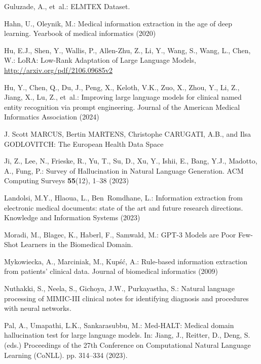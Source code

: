 \begin{thebibliography}{10}
Guluzade, A., et~al.: {ELMTEX Dataset}. 

Hahn, U., Oleynik, M.: Medical information extraction in the age of deep learning. Yearbook of medical informatics  (2020)

Hu, E.J., Shen, Y., Wallis, P., Allen-Zhu, Z., Li, Y., Wang, S., Wang, L., Chen, W.: {LoRA: Low-Rank Adaptation of Large Language Models}, \url{http://arxiv.org/pdf/2106.09685v2}

Hu, Y., Chen, Q., Du, J., Peng, X., Keloth, V.K., Zuo, X., Zhou, Y., Li, Z., Jiang, X., Lu, Z., et~al.: Improving large language models for clinical named entity recognition via prompt engineering. Journal of the American Medical Informatics Association  (2024)

{J. Scott MARCUS}, {Bertin MARTENS}, {Christophe CARUGATI}, A.B., {and Ilsa GODLOVITCH}: {The European Health Data Space}

Ji, Z., Lee, N., Frieske, R., Yu, T., Su, D., Xu, Y., Ishii, E., Bang, Y.J., Madotto, A., Fung, P.: {Survey of Hallucination in Natural Language Generation}. {ACM Computing Surveys}  \textbf{55}(12),  1--38 (2023)

Landolsi, M.Y., Hlaoua, L., Ben~Romdhane, L.: Information extraction from electronic medical documents: state of the art and future research directions. Knowledge and Information Systems  (2023)

Moradi, M., Blagec, K., Haberl, F., Samwald, M.: {GPT-3 Models are Poor Few-Shot Learners in the Biomedical Domain}. 

Mykowiecka, A., Marciniak, M., Kup{\'s}{\'c}, A.: Rule-based information extraction from patients’ clinical data. Journal of biomedical informatics  (2009)

Nuthakki, S., Neela, S., Gichoya, J.W., Purkayastha, S.: {Natural language processing of MIMIC-III clinical notes for identifying diagnosis and procedures with neural networks}. 

Pal, A., Umapathi, L.K., Sankarasubbu, M.: {M}ed-{HALT}: Medical domain hallucination test for large language models. In: Jiang, J., Reitter, D., Deng, S. (eds.) Proceedings of the 27th Conference on Computational Natural Language Learning (CoNLL). pp. 314--334 (2023). 


\end{thebibliography}
